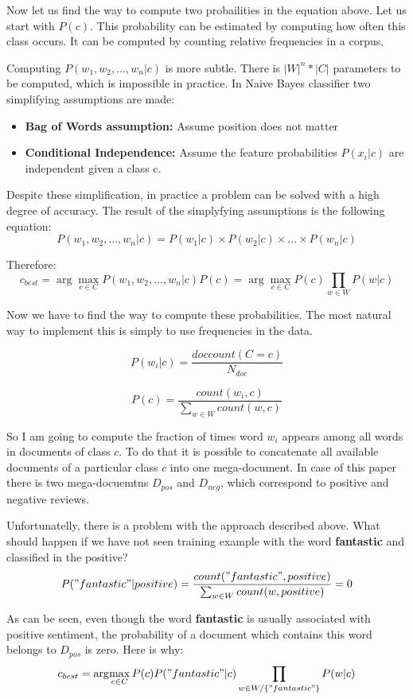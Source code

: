 \documentclass[12pt]{report}
\begin{document}
Now let us find the way to compute two probailities in the equation above. Let us start with $P(c)$. This probability can be estimated by computing how often this class occurs. It can be computed by counting relative frequencies in a corpus.

Computing $P(w_1, w_2,..., w_n | c)$ is more subtle. There is $|W|^n * |C|$ parameters to be computed, which is impossible in practice. In Naive Bayes classifier two simplifying assumptions are made:

\begin{itemize}
  \item \textbf{Bag of Words assumption:} Assume position does not matter
  \item \textbf{Conditional Independence:} Assume the feature probabilities $P(x_i | c)$ are independent given a class c.
\end{itemize}

Despite these simplification, in practice a problem can be solved with a high degree of accuracy. The result of the simplyfying assumptions is the following equation:
$$P(w_1, w_2,..., w_n | c) = P(w_1 | c) \times P(w_2 | c) \times ... \times P(w_n | c)$$

Therefore:
$$c_{best} = \arg\!\max_{c \in C} {P(w_1, w_2,..., w_n | c) P(c)} = \arg\!\max_{c \in C} P(c) \prod_{w \in W} {P(w | c) }$$

Now we have to find the way to compute these probabilities. The most natural way to implement this is simply to use frequencies in the data.

$$P(w_i | c) = \dfrac{doccount(C=c)}{N_{doc}}$$

$$P(c) = \dfrac{count(w_i, c)}{\sum_{w \in W} {count(w, c)}}$$

So I am going to compute the fraction of times word $w_i$ appears among all words in documents of class $c$. To do that it is possible to concatenate all available documents of a particular class $c$ into one mega-document. In case of this paper there is two mega-docuemtns $D_{pos}$ and $D_{neg}$, which correspond to positive and negative reviews.

Unfortunatelly, there is a problem with the approach described above. What should happen if we have not seen training example with the word \textbf{fantastic} and classified in the positive?
$$P("fantastic" | positive) = \dfrac{count("fantastic", positive)}{\sum_{w \in W} {count(w, positive)}} = 0$$

As can be seen, even though the word \textbf{fantastic} is usually associated with positive sentiment, the probability of a document which contains this word belongs to $D_{pos}$ is zero. Here is why:
$$c_{best} = \arg\!\max_{c \in C} P(c) P("fantastic" | c) \prod_{w \in W/\{"fantastic"\}} {P(w | c) }$$
\end{document}
